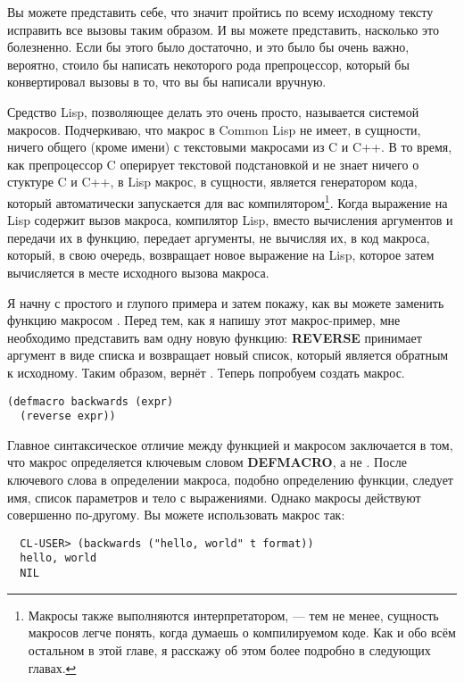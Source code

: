 Вы можете представить себе, что значит пройтись по всему исходному тексту исправить все
вызовы  таким образом. И вы можете представить, насколько это болезненно. Если
бы этого было достаточно, и это было бы очень важно, вероятно, стоило бы написать
некоторого рода препроцессор, который бы конвертировал вызовы  в то, что вы бы
написали вручную.

Средство Lisp, позволяющее делать это очень просто, называется системой
макросов. Подчеркиваю, что макрос в Common Lisp не имеет, в сущности, ничего общего (кроме
имени) с текстовыми макросами из C и C++. В то время, как препроцессор C оперирует
текстовой подстановкой и не знает ничего о стуктуре C и C++, в Lisp макрос, в сущности,
является генератором кода, который автоматически запускается для вас
компилятором\footnote{Макросы также выполняются интерпретатором, --- тем не менее,
  сущность макросов легче понять, когда думаешь о компилируемом коде. Как и обо всём
  остальном в этой главе, я расскажу об этом более подробно в следующих главах.}. Когда
выражение на Lisp содержит вызов макроса, компилятор Lisp, вместо вычисления аргументов и
передачи их в функцию, передает аргументы, не вычисляя их, в код макроса, который, в свою
очередь, возвращает новое выражение на Lisp, которое затем вычисляется в месте исходного
вызова макроса.

Я начну с простого и глупого примера и затем покажу, как вы можете заменить функцию
 макросом . Перед тем, как я напишу этот макрос-пример, мне
необходимо представить вам одну новую функцию: \textbf{REVERSE} принимает аргумент в виде
списка и возвращает новый список, который является обратным к исходному. Таким образом,
 вернёт . Теперь попробуем создать макрос.

\begin{lstlisting}
(defmacro backwards (expr)
  (reverse expr))
\end{lstlisting}

Главное синтаксическое отличие между функцией и макросом заключается в том, что макрос
определяется ключевым словом \textbf{DEFMACRO}, а не . После ключевого слова в
определении макроса, подобно определению функции, следует имя, список параметров и тело с
выражениями. Однако макросы действуют совершенно по-другому. Вы можете использовать макрос
так:

\begin{verbatim}
  CL-USER> (backwards ("hello, world" t format))
  hello, world
  NIL
\end{verbatim}

